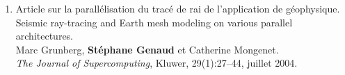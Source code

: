 \documentclass[11pt]{article}
\begin{document}
\begin{enumerate}
\item Article sur la parallélisation du tracé de rai de l'application de géophysique.\\
Seismic ray-tracing and Earth mesh modeling on various parallel architectures.\\
Marc Grunberg, \textbf{Stéphane Genaud} et Catherine Mongenet.\\
{\em The Journal of Supercomputing}, Kluwer, 29(1):27--44, juillet 2004.\\
\end{enumerate}

\end{document}
